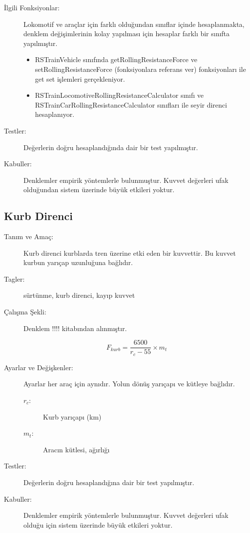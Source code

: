 \documentclass[10pt,a4paper]{article}
\begin{document}
\begin{description}
\item[İlgili Fonksiyonlar:] Lokomotif ve araçlar için farklı olduğundan sınıflar içinde hesaplanmakta, denklem değişimlerinin kolay yapılması için hesaplar farklı bir sınıfta yapılmıştır.
\begin{itemize}
\item RSTrainVehicle sınıfında getRollingResistanceForce ve setRollingResistanceForce (fonksiyonlara referans ver) fonksiyonları ile get set işlemleri gerçekleniyor. 
\item RSTrainLocomotiveRollingResistanceCalculator sınıfı ve RSTrainCarRollingResistanceCalculator sınıfları ile seyir direnci hesaplanıyor.
\end{itemize}

\item[Testler:]Değerlerin doğru hesaplandığında dair bir test yapılmıştır.

\item[Kabuller:]Denklemler empirik yöntemlerle bulunmuştur. Kuvvet değerleri ufak olduğundan sistem üzerinde büyük etkileri yoktur. 

\end{description}
\newpage

\subsection{Kurb Direnci}
\begin{description}
\item[Tanım ve Amaç:] Kurb direnci kurblarda tren üzerine etki eden bir kuvvettir. Bu kuvvet kurbun yarıçap uzunluğuna bağlıdır.
\item[Tagler:]sürtünme, kurb direnci, kayıp kuvvet
\item[Çalışma Şekli:] Denklem !!!! kitabından alınmıştır.

\begin{equation}
F_{kurb} = \dfrac{6500}{r_c - 55} \times m_t
\end{equation}

\item[Ayarlar ve Değişkenler:] Ayarlar her araç için aynıdır. Yolun dönüş yarıçapı ve kütleye bağlıdır.
\begin{description}
\item[$r_c$:] Kurb yarıçapı (km)
\item[$m_t$:] Aracın kütlesi, ağırlığı
\end{description}


\item[Testler:] Değerlerin doğru hesaplandığına dair bir test yapılmıştır.
\item[Kabuller:] Denklemler empirik yöntemlerle bulunmuştur. Kuvvet değerleri ufak olduğu için sistem üzerinde büyük etkileri yoktur.
\end{description}
\newpage
\end{document}
